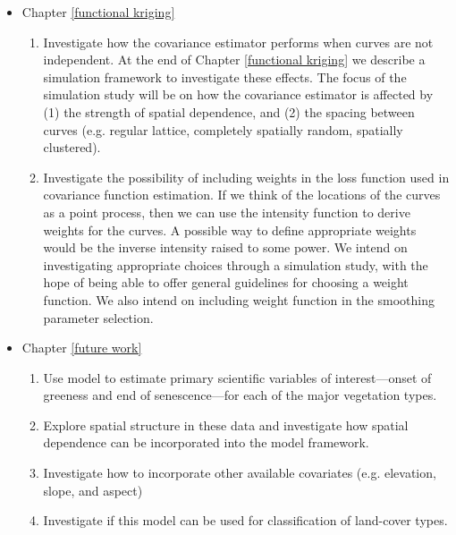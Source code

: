 \begin{itemize}
\item Chapter \ref{functional kriging}
\begin{enumerate}
\item Investigate how the covariance estimator performs when curves are not independent. At the end of Chapter \ref{functional kriging} we describe a simulation framework to investigate these effects. The focus of the simulation study will be on how the covariance estimator is affected by (1) the strength of spatial dependence, and (2) the spacing between curves (e.g. regular lattice, completely spatially random, spatially clustered).
\item Investigate the possibility of including weights in the loss function used in covariance function estimation. If we think of the locations of the curves as a point process, then we can use the intensity function to derive weights for the curves.  A possible way to define appropriate weights would be the inverse intensity raised to some power. We intend on investigating appropriate choices through a simulation study, with the hope of being able to offer general guidelines for  choosing a weight function. We also intend on including weight function in the smoothing parameter selection. 
\end{enumerate}
\item Chapter \ref{future work}
\begin{enumerate}
\item Use model to estimate primary scientific variables of interest---onset of greeness and end of senescence---for each of the major vegetation types.
\item Explore spatial structure in these data and investigate how spatial dependence can be incorporated into the model framework.
\item Investigate how to incorporate other available covariates (e.g. elevation, slope, and aspect)
\item Investigate if this model can be used for classification of land-cover types.
\end{enumerate}
\end{itemize}